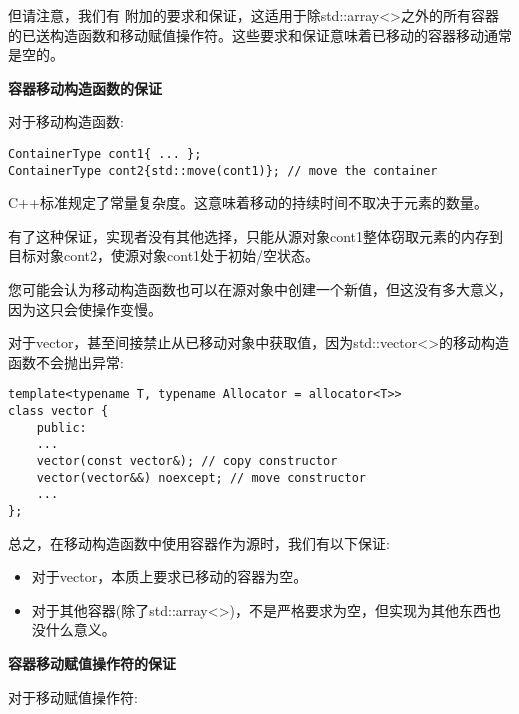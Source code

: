 但请注意，我们有 附加的要求和保证，这适用于除std::array<>之外的所有容器的已送构造函数和移动赋值操作符。这些要求和保证意味着已移动的容器移动通常是空的。\par

\hspace*{\fill} \par %
\textbf{容器移动构造函数的保证}

对于移动构造函数:\par

\begin{lstlisting}[caption={}]
ContainerType cont1{ ... };
ContainerType cont2{std::move(cont1)}; // move the container
\end{lstlisting}

C++标准规定了常量复杂度。这意味着移动的持续时间不取决于元素的数量。\par

有了这种保证，实现者没有其他选择，只能从源对象cont1整体窃取元素的内存到目标对象cont2，使源对象cont1处于初始/空状态。\par

您可能会认为移动构造函数也可以在源对象中创建一个新值，但这没有多大意义，因为这只会使操作变慢。\par

对于vector，甚至间接禁止从已移动对象中获取值，因为std::vector<>的移动构造函数不会抛出异常:\par

\begin{lstlisting}[caption={}]
template<typename T, typename Allocator = allocator<T>>
class vector {
	public:
	...
	vector(const vector&); // copy constructor
	vector(vector&&) noexcept; // move constructor
	...
};
\end{lstlisting}

总之，在移动构造函数中使用容器作为源时，我们有以下保证:\par

\begin{itemize}
	\item 对于vector，本质上要求已移动的容器为空。
	\item 对于其他容器(除了std::array<>)，不是严格要求为空，但实现为其他东西也没什么意义。
\end{itemize}

\hspace*{\fill} \par %
\textbf{容器移动赋值操作符的保证}

对于移动赋值操作符:\par

